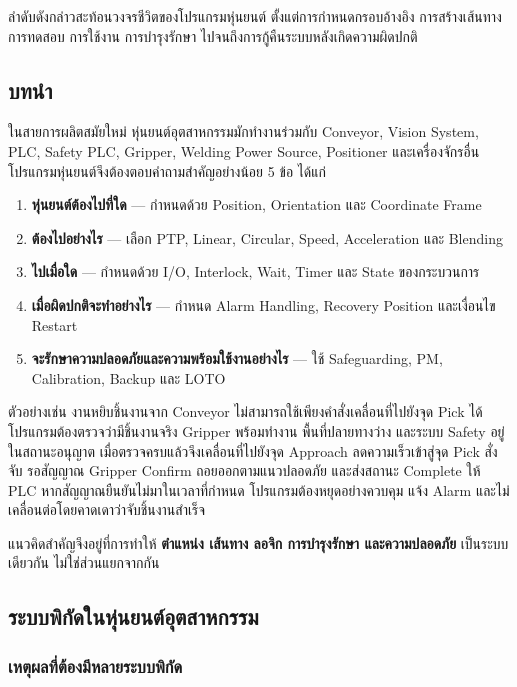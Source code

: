 ลำดับดังกล่าวสะท้อนวงจรชีวิตของโปรแกรมหุ่นยนต์ ตั้งแต่การกำหนดกรอบอ้างอิง การสร้างเส้นทาง การทดสอบ การใช้งาน การบำรุงรักษา ไปจนถึงการกู้คืนระบบหลังเกิดความผิดปกติ

\newpage

\subsection{บทนำ}

ในสายการผลิตสมัยใหม่ หุ่นยนต์อุตสาหกรรมมักทำงานร่วมกับ Conveyor, Vision System, PLC, Safety PLC, Gripper, Welding Power Source, Positioner และเครื่องจักรอื่น โปรแกรมหุ่นยนต์จึงต้องตอบคำถามสำคัญอย่างน้อย 5 ข้อ ได้แก่

\begin{enumerate}
    \item \textbf{หุ่นยนต์ต้องไปที่ใด} — กำหนดด้วย Position, Orientation และ Coordinate Frame
    \item \textbf{ต้องไปอย่างไร} — เลือก PTP, Linear, Circular, Speed, Acceleration และ Blending
    \item \textbf{ไปเมื่อใด} — กำหนดด้วย I/O, Interlock, Wait, Timer และ State ของกระบวนการ
    \item \textbf{เมื่อผิดปกติจะทำอย่างไร} — กำหนด Alarm Handling, Recovery Position และเงื่อนไข Restart
    \item \textbf{จะรักษาความปลอดภัยและความพร้อมใช้งานอย่างไร} — ใช้ Safeguarding, PM, Calibration, Backup และ LOTO
\end{enumerate}

ตัวอย่างเช่น งานหยิบชิ้นงานจาก Conveyor ไม่สามารถใช้เพียงคำสั่งเคลื่อนที่ไปยังจุด Pick ได้ โปรแกรมต้องตรวจว่ามีชิ้นงานจริง Gripper พร้อมทำงาน พื้นที่ปลายทางว่าง และระบบ Safety อยู่ในสถานะอนุญาต เมื่อตรวจครบแล้วจึงเคลื่อนที่ไปยังจุด Approach ลดความเร็วเข้าสู่จุด Pick สั่งจับ รอสัญญาณ Gripper Confirm ถอยออกตามแนวปลอดภัย และส่งสถานะ Complete ให้ PLC หากสัญญาณยืนยันไม่มาในเวลาที่กำหนด โปรแกรมต้องหยุดอย่างควบคุม แจ้ง Alarm และไม่เคลื่อนต่อโดยคาดเดาว่าจับชิ้นงานสำเร็จ

แนวคิดสำคัญจึงอยู่ที่การทำให้ \textbf{ตำแหน่ง เส้นทาง ลอจิก การบำรุงรักษา และความปลอดภัย} เป็นระบบเดียวกัน ไม่ใช่ส่วนแยกจากกัน                                                

\subsection{ระบบพิกัดในหุ่นยนต์อุตสาหกรรม}

\subsubsection{เหตุผลที่ต้องมีหลายระบบพิกัด}

